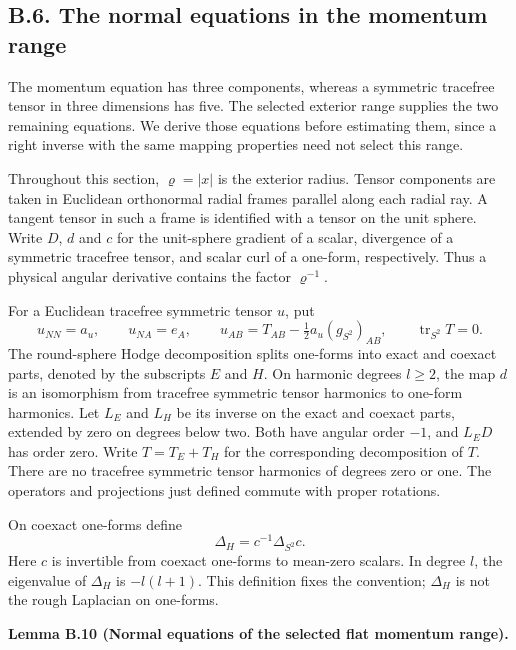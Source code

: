 \documentclass[
  english,
  11pt,
  reqno]{amsart}
\makeatletter
\newcommand{\pandocstatementheading}[1]{%
  \par\if@nobreak\else
    \addpenalty{\@beginparpenalty}%
    \addvspace{.5\baselineskip plus .2\baselineskip minus .2\baselineskip}%
  \fi
  {\normalfont\bfseries #1\par}%
  \nobreak\@afterindenttrue\@afterheading
}
\makeatother
\begin{document}
\subsection{B.6. The normal equations in the momentum
range}\label{b.6.-the-normal-equations-in-the-momentum-range}\label{sec:online-momentum-range-normal-equations}

The momentum equation has three components, whereas a symmetric
tracefree tensor in three dimensions has five. The selected exterior
range supplies the two remaining equations. We derive those equations
before estimating them, since a right inverse with the same mapping
properties need not select this range.

Throughout this section, \(\varrho=|x|\) is the exterior radius. Tensor
components are taken in Euclidean orthonormal radial frames parallel
along each radial ray. A tangent tensor in such a frame is identified
with a tensor on the unit sphere. Write \(D\), \(d\) and \(c\) for the
unit-sphere gradient of a scalar, divergence of a symmetric tracefree
tensor, and scalar curl of a one-form, respectively. Thus a physical
angular derivative contains the factor \(\varrho^{-1}\).

For a Euclidean tracefree symmetric tensor \(u\), put%
 \[
u_{NN}=a_u,\qquad u_{NA}=e_A,\qquad
u_{AB}=T_{AB}-\tfrac12a_u(g_{S^2})_{AB},
\qquad \operatorname{tr}_{S^2}T=0.
\] The round-sphere Hodge decomposition splits one-forms into exact and
coexact parts, denoted by the subscripts \(E\) and \(H\). On harmonic
degrees \(l\ge2\), the map \(d\) is an isomorphism from tracefree
symmetric tensor harmonics to one-form harmonics. Let \(L_E\) and
\(L_H\) be its inverse on the exact and coexact parts, extended by zero
on degrees below two. Both have angular order \(-1\), and \(L_ED\) has
order zero. Write \(T=T_E+T_H\) for the corresponding decomposition of
\(T\). There are no tracefree symmetric tensor harmonics of degrees zero
or one. The operators and projections just defined commute with proper
rotations.

On coexact one-forms define \[
\Delta_H=c^{-1}\Delta_{S^2}c.
\] Here \(c\) is invertible from coexact one-forms to mean-zero scalars.
In degree \(l\), the eigenvalue of \(\Delta_H\) is \(-l(l+1)\). This
definition fixes the convention; \(\Delta_H\) is not the rough Laplacian
on one-forms.

\pandocstatementheading{\leavevmode{}\label{lem:online-momentum-explicit-range-identities}Lemma B.10 (Normal equations of the selected flat momentum range).}
\end{document}
